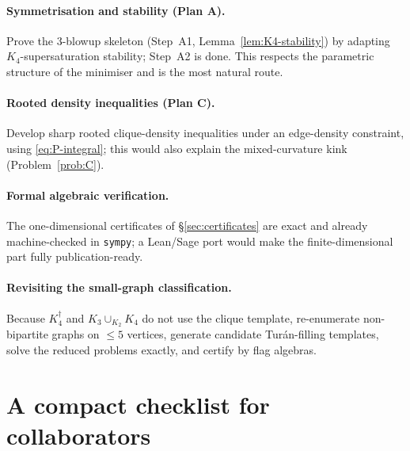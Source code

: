 \documentclass[11pt]{amsart}
\theoremstyle{definition}
\newcommand{\1}{\mathbf 1}
\begin{document}
\paragraph{Symmetrisation and stability (Plan A).}  Prove the $3$-blowup skeleton
(Step~A1, Lemma~\ref{lem:K4-stability}) by adapting $K_4$-supersaturation
stability; Step~A2 is done.  This respects the parametric structure of the
minimiser and is the most natural route.

\paragraph{Rooted density inequalities (Plan C).}  Develop sharp rooted
clique-density inequalities under an edge-density constraint, using
\eqref{eq:P-integral}; this would also explain the mixed-curvature kink
(Problem~\ref{prob:C}).

\paragraph{Formal algebraic verification.}  The one-dimensional certificates of
\S\ref{sec:certificates} are exact and already machine-checked in \texttt{sympy};
a Lean/Sage port would make the finite-dimensional part fully publication-ready.

\paragraph{Revisiting the small-graph classification.}  Because $K_4^\dagger$ and
$K_3\cup_{K_2}K_4$ do not use the clique template, re-enumerate non-bipartite
graphs on $\le5$ vertices, generate candidate Tur\'an-filling templates, solve the
reduced problems exactly, and certify by flag algebras.

\section{A compact checklist for collaborators}
\label{sec:checklist}
\end{document}
